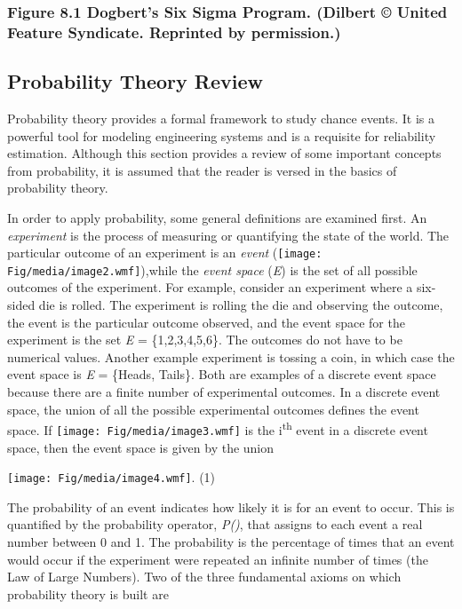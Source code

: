 \subsubsection*{Figure 8.1 Dogbert's Six Sigma Program. (Dilbert ©
United Feature Syndicate. Reprinted by
permission.)}\label{figure-8.1-dogberts-six-sigma-program.-dilbert-united-feature-syndicate.-reprinted-by-permission.}

\subsection{Probability Theory Review}\label{probability-theory-review}

Probability theory provides a formal framework to study chance events.
It is a powerful tool for modeling engineering systems and is a
requisite for reliability estimation. Although this section provides a
review of some important concepts from probability, it is assumed that
the reader is versed in the basics of probability theory.

In order to apply probability, some general definitions are examined
first. An \emph{experiment} is the process of measuring or quantifying
the state of the world. The particular outcome of an experiment is an
\emph{event} (\texttt{[image: Fig/media/image2.wmf]}),while the
\emph{event space} (\emph{E}) is the set of all possible outcomes of the
experiment. For example, consider an experiment where a six-sided die is
rolled. The experiment is rolling the die and observing the outcome, the
event is the particular outcome observed, and the event space for the
experiment is the set \emph{E} = \{1,2,3,4,5,6\}. The outcomes do not
have to be numerical values. Another example experiment is tossing a
coin, in which case the event space is \emph{E} = \{Heads, Tails\}. Both
are examples of a discrete event space because there are a finite number
of experimental outcomes. In a discrete event space, the union of all
the possible experimental outcomes defines the event space. If
\texttt{[image: Fig/media/image3.wmf]} is the i\textsuperscript{th}
event in a discrete event space, then the event space is given by the
union

\texttt{[image: Fig/media/image4.wmf]}. (1)

The probability of an event indicates how likely it is for an event to
occur. This is quantified by the probability operator, \emph{P()}, that
assigns to each event a real number between 0 and 1. The probability is
the percentage of times that an event would occur if the experiment were
repeated an infinite number of times (the Law of Large Numbers). Two of
the three fundamental axioms on which probability theory is built are

